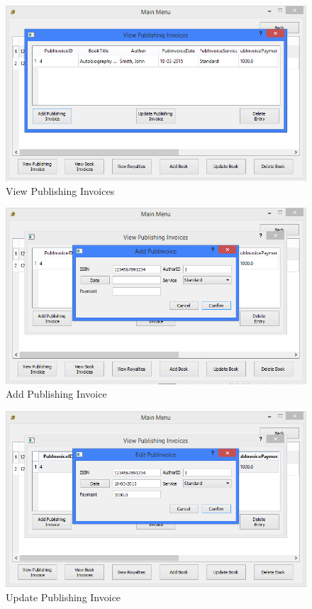 \begin{figure}[H]
    \caption{View Publishing Invoices} \label{fig:ViewPubInvoices}
    \includegraphics[width=\textwidth]{./Maintenance/UserInterface/ViewPubInvoices.png}
\end{figure}

\begin{figure}[H]
    \caption{Add Publishing Invoice} \label{fig:AddPubInvoice}
    \includegraphics[width=\textwidth]{./Maintenance/UserInterface/AddPubInvoice.png}
\end{figure}

\begin{figure}[H]
    \caption{Update Publishing Invoice} \label{fig:UpdatePubInvoice}
    \includegraphics[width=\textwidth]{./Maintenance/UserInterface/UpdatePubInvoice.png}
\end{figure}


